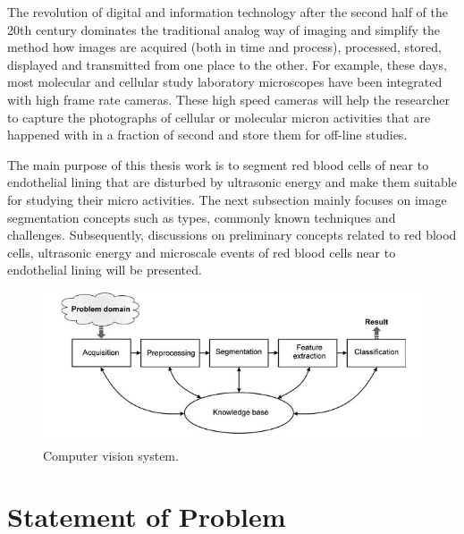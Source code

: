 The revolution of digital and information technology after the second half of the 20th century dominates the traditional analog way of imaging and simplify the method how images are acquired (both in time and process), processed, stored, displayed and transmitted from one place to the other. For example, these days, most molecular and cellular study laboratory microscopes have been integrated with high frame rate cameras. These high speed cameras will help the researcher to capture the photographs of cellular or molecular micron activities that are happened with in a fraction of second and store them for off-line studies.

The main purpose of this thesis work is to segment red blood cells of near to endothelial lining that are disturbed by ultrasonic energy and make them suitable for studying their micro activities.  The next subsection mainly focuses on image segmentation concepts such as types, commonly known techniques and challenges. Subsequently, discussions on preliminary concepts related to red blood cells, ultrasonic energy and microscale events of red blood cells near to endothelial lining will be presented. 

\begin{figure}[th]
	\centering
	\includegraphics{Figures/computervisionsystem.png}
	\caption[Computer Vision System]{Computer vision system.}
	\label{fig:Computer Vision System}
\end{figure}



\section{Statement of Problem}

